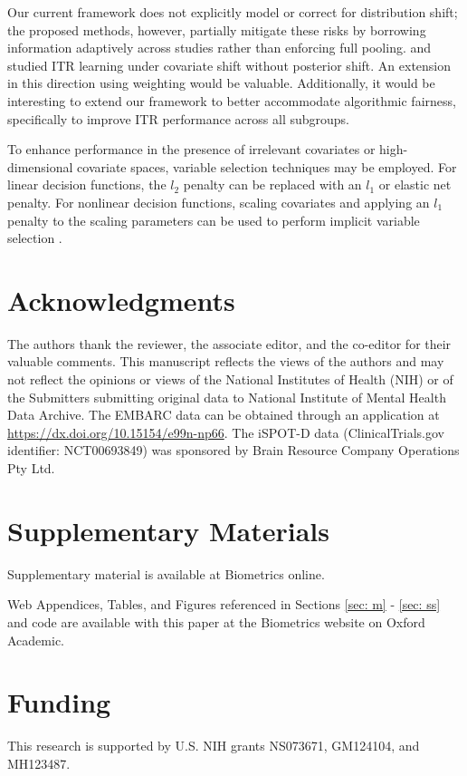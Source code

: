 \documentclass[12pt]{article}
\begin{document}
Our current framework does not explicitly model or correct for distribution shift; the proposed methods, however, partially mitigate these risks by borrowing information adaptively across studies rather than enforcing full pooling. \cite{chen2024robust} and \cite{chen2024optimizing} studied ITR learning under covariate shift without posterior shift. An extension in this direction using weighting would be valuable. Additionally, it would be interesting to extend our framework to better accommodate algorithmic fairness, specifically to improve ITR performance across all subgroups.

To enhance performance in the presence of irrelevant covariates or high-dimensional covariate spaces, variable selection techniques may be employed. For linear decision functions, the $l_2$ penalty can be replaced with an $l_1$ \citep{tibshirani1996regression} or elastic net \citep{zou2005regularization} penalty. For nonlinear decision functions, scaling covariates and applying an $l_1$ penalty to the scaling parameters can be used to perform implicit variable selection \citep{zhou2017residual}.

\section*{Acknowledgments}
The authors thank the reviewer, the associate editor, and the co-editor for their valuable comments. This manuscript reflects the views of the authors and may not reflect the opinions or views of the National Institutes of Health (NIH) or of the Submitters submitting original data to National Institute of Mental Health Data Archive. The EMBARC data can be obtained through an application at \url{https://dx.doi.org/10.15154/e99n-np66}. The iSPOT-D data (ClinicalTrials.gov identifier: NCT00693849) was sponsored by Brain Resource Company Operations Pty Ltd.

\section*{Supplementary Materials}
Supplementary material is available at Biometrics online.

Web Appendices, Tables, and Figures referenced in Sections \ref{sec: m} - \ref{sec: ss} and code are available with this paper at the Biometrics website on Oxford Academic.

\section*{Funding}
This research is supported by U.S. NIH grants NS073671, GM124104, and MH123487.



\end{document}
